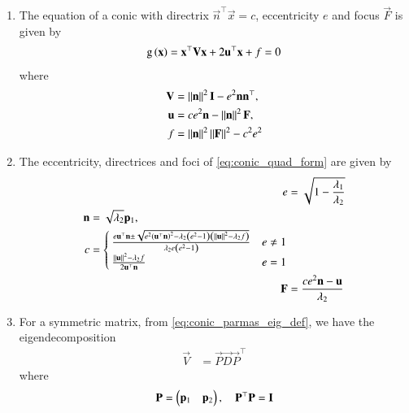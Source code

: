 \begin{enumerate}[label=\thesubsection.\arabic*.,ref=\thesubsection.\theenumi]
\item
The equation of  a conic with directrix $\vec{n}^{\top}\vec{x} = c$, eccentricity $e$ and focus $\vec{F}$ is given by 
\begin{align}
    \label{eq:conic_quad_form}
	\text{g}\left(\mathbf{x}\right) = \mathbf{x}^{\top}\mathbf{V}\mathbf{x}+2\mathbf{u}^{\top}\mathbf{x}+f=0
    \end{align}
where     
\begin{align}
  \label{eq:conic_quad_form_v}
\mathbf{V} &=\left\lVert\mathbf{n}\right\rVert^2\mathbf{I}-e^2\mathbf{n}\mathbf{n}^{\top}, 
\\
\label{eq:conic_quad_form_u}
\mathbf{u} &= ce^2\mathbf{n}-\left\lVert\mathbf{n}\right\rVert^2\mathbf{F}, 
\\
\label{eq:conic_quad_form_f}
f &= \left\lVert\mathbf{n}\right\rVert^2\left\lVert\mathbf{F}\right\rVert^2-c^2e^2
    \end{align}
\item
	\label{prob:conic-params}
  The eccentricity, directrices and foci of \eqref{eq:conic_quad_form} are given by 
\begin{align}
  \label{eq:conic_quad_form_e} 
  e&= \sqrt{1-\frac{\lambda_1}{\lambda_2}}
\\
\label{eq:conic_quad_form_nc} 
	\begin{split}
  \mathbf{n}&= \sqrt{\lambda_2}\mathbf{p}_1,  
  \\
	c &= 
  \begin{cases}
    \frac{e\mathbf{u}^{\top}\mathbf{n} \pm \sqrt{e^2\left(\mathbf{u}^{\top}\mathbf{n}\right)^2-\lambda_2\left(e^2-1\right)\left(\left\lVert\mathbf{u}\right\rVert^2 - \lambda_2 f\right)}}{\lambda_2e\left(e^2-1\right)} & e \ne 1
    \\
    \frac{\left\lVert\mathbf{u}\right\rVert^2 - \lambda_2 f   }{2\mathbf{u}^{\top}\mathbf{n}} & e = 1
  \end{cases}
	\end{split}
  \\
  \label{eq:conic_quad_form_F} 
  \mathbf{F}  &= \frac{ce^2\mathbf{n}-\mathbf{u}}{\lambda_2}
\end{align}  
	\item For a symmetric matrix, from \eqref{eq:conic_parmas_eig_def}, we have the eigendecomposition
\begin{align}
	\vec{V}&=\vec{P}\vec{D}
\vec{P}^{\top}
\end{align}
where 
%
\begin{align}
	\vec{P} &= \myvec{\vec{p}_1 & \vec{p}_2}, \quad 
\vec{P}^{\top}\vec{P} = 
	\vec{I}
\label{eq:eig_matrix}
\\

\end{align}
\end{enumerate}
